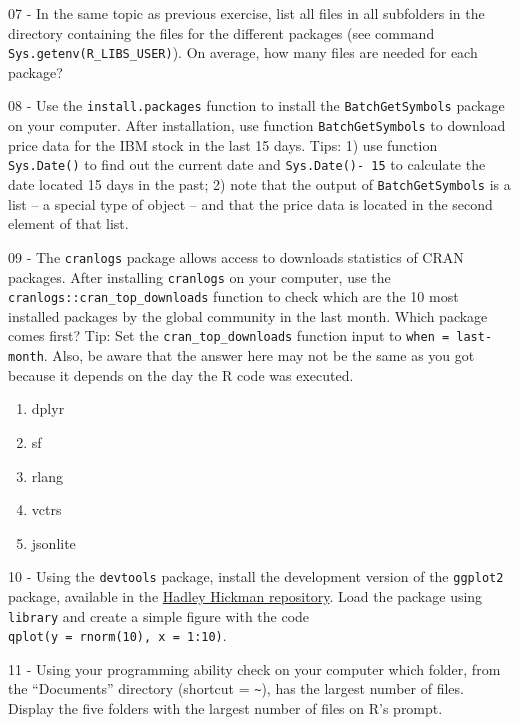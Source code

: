 \documentclass[
  12pt,
]{book}
\providecommand{\tightlist}{%
  \setlength{\itemsep}{0pt}\setlength{\parskip}{0pt}}
\begin{document}
07 -
In the same topic as previous exercise, list all files in all subfolders in the directory containing the files for the different packages (see command \texttt{Sys.getenv(\textquotesingle{}R\_LIBS\_USER\textquotesingle{})}). On average, how many files are needed for each package?

08 -
Use the \texttt{install.packages} function to install the \texttt{BatchGetSymbols} package on your computer. After installation, use function \texttt{BatchGetSymbols} to download price data for the IBM stock in the last 15 days. Tips: 1) use function \texttt{Sys.Date()} to find out the current date and \texttt{Sys.Date()-\ 15} to calculate the date located 15 days in the past; 2) note that the output of \texttt{BatchGetSymbols} is a list -- a special type of object -- and that the price data is located in the second element of that list.

09 -
The \texttt{cranlogs} package allows access to downloads statistics of CRAN packages. After installing \texttt{cranlogs} on your computer, use the \texttt{cranlogs::cran\_top\_downloads} function to check which are the 10 most installed packages by the global community in the last month. Which package comes first? Tip: Set the \texttt{cran\_top\_downloads} function input to \texttt{when\ =\ \textquotesingle{}last-month\textquotesingle{}}. Also, be aware that the answer here may not be the same as you got because it depends on the day the R code was executed.

\begin{enumerate}
\def\labelenumi{\alph{enumi})}
\tightlist
\item
  dplyr
\item
  sf
\item
  rlang
\item
  vctrs
\item
  jsonlite
\end{enumerate}

10 -
Using the \texttt{devtools} package, install the development version of the \texttt{ggplot2} package, available in the \href{https://github.com/hadley}{Hadley Hickman repository}. Load the package using \texttt{library} and create a simple figure with the code \texttt{qplot(y\ =\ rnorm(10),\ x\ =\ 1:10)}.

11 -
Using your programming ability check on your computer which folder, from the ``Documents'' directory (shortcut = \texttt{\textasciitilde{}}), has the largest number of files. Display the five folders with the largest number of files on R's prompt.
\end{document}

